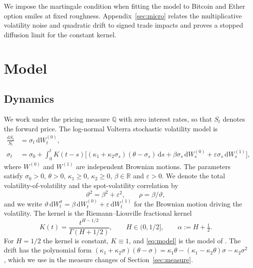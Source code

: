 \documentclass{rQUF2e}
\theoremstyle{plain}
\theoremstyle{definition}
\theoremstyle{remark}
\newcommand{\D}{\mathrm{d}}
\newcommand{\Q}{\mathbb{Q}}
\begin{document}
We impose the martingale condition when fitting the model to Bitcoin and Ether option smiles at fixed roughness. Appendix~\ref{sec:micro} relates the multiplicative volatility noise and quadratic drift to signed trade impacts and proves a stopped diffusion limit for the constant kernel.
\section{Model}\label{sec:model}

\subsection{Dynamics}

We work under the pricing measure $\Q$ with zero interest rates, so that $S_t$ denotes the forward price. The log-normal Volterra stochastic volatility model is
\begin{equation}\label{eq:model}
\begin{split}
\frac{\D S_t}{S_t} &= \sigma_t\,\D W^{(0)}_t,\\
\sigma_t &= \sigma_0+\int_0^t K(t-s)\Big[(\kappa_1+\kappa_2\sigma_s)(\theta-\sigma_s)\,\D s+\beta\sigma_s\,\D W^{(0)}_s+\varepsilon\sigma_s\,\D W^{(1)}_s\Big],
\end{split}
\end{equation}
where $W^{(0)}$ and $W^{(1)}$ are independent Brownian motions. The parameters satisfy $\sigma_0>0$, $\theta>0$, $\kappa_1\ge0$, $\kappa_2\ge0$, $\beta\in\mathbb{R}$ and $\varepsilon>0$. We denote the total volatility-of-volatility and the spot-volatility correlation by
\begin{equation}\label{eq:vartheta}
\vartheta^2=\beta^2+\varepsilon^2,\qquad \rho=\beta/\vartheta,
\end{equation}
and we write $\vartheta\,\D W^{\sigma}_t=\beta\,\D W^{(0)}_t+\varepsilon\,\D W^{(1)}_t$ for the Brownian motion driving the volatility. The kernel is the Riemann--Liouville fractional kernel
\begin{equation}\label{eq:kernel}
K(t)=\frac{t^{H-1/2}}{\Gamma(H+1/2)},\qquad H\in(0,1/2],\qquad \alpha:=H+\tfrac12 .
\end{equation}
For $H=1/2$ the kernel is constant, $K\equiv1$, and \eqref{eq:model} is the model of \citet{SeppRakhmonov2023}. The drift has the polynomial form $(\kappa_1+\kappa_2\sigma)(\theta-\sigma)=\kappa_1\theta-(\kappa_1-\kappa_2\theta)\sigma-\kappa_2\sigma^2$, which we use in the measure changes of Section~\ref{sec:measure}.
\end{document}
